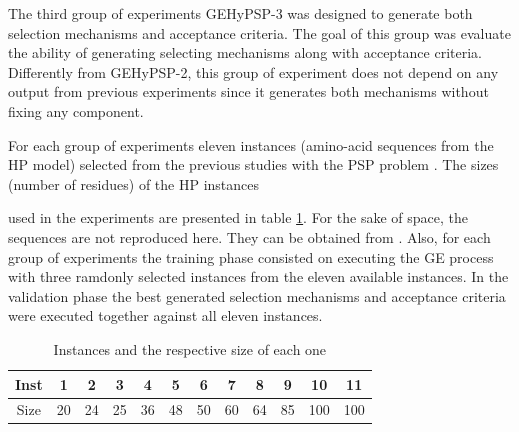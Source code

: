 \documentclass[conference]{IEEEtran}
\begin{document}

The third group of experiments GEHyPSP-3 was designed to  generate both selection mechanisms and acceptance criteria. The goal of this group was evaluate the ability of generating selecting mechanisms along with acceptance criteria. Differently from GEHyPSP-2, this group of experiment does not depend on any output from previous experiments since it generates both mechanisms without fixing any component.



For each group of experiments eleven instances (amino-acid sequences from the HP model) selected from the previous studies with the PSP problem \cite{custodio2004investigation,hsu2003growth,lin2011protein,unger1993genetic,santana2008component,custodio2014multiple, garza2012locality}. The sizes (number of residues) of the HP instances

 used in the experiments are presented in table \ref{tab:instances}. 
 For the sake of space, the sequences are not reproduced here. They can be obtained from \cite{santana2008component}. Also, for each group of experiments the training phase consisted on executing the GE process with three ramdonly selected instances from the eleven available instances. In the validation phase the best generated selection mechanisms and acceptance criteria were executed together against all eleven instances. 

\begin{table}[]
	\centering
	\caption{Instances and the respective size of each one}
	\label{tab:instances}
	\begin{tabular}{cccccccccccc}
		Inst & 1 & 2 & 3 & 4 & 5 & 6 & 7 & 8 & 9 & 10 & 11 \\ \hline
		Size & 20 & 24 & 25 & 36 & 48 & 50 & 60 & 64 & 85 & 100 & 100 \\ \hline
	\end{tabular}
\end{table}



\end{document}
